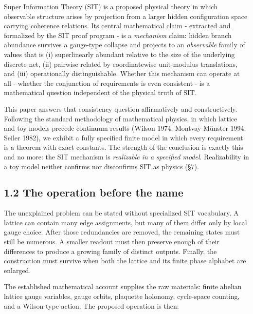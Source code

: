 \documentclass[
  american,
  11pt,
  letterpaper,
]{article}
\begin{document}
Super Information Theory (SIT) is a proposed physical theory in which observable structure arises by projection from a larger hidden configuration space carrying coherence relations. Its central mathematical claim - extracted and formalized by the SIT proof program - is a \emph{mechanism} claim: hidden branch abundance survives a gauge-type collapse and projects to an \emph{observable} family of values that is (i) superlinearly abundant relative to the size of the underlying discrete net, (ii) pairwise related by coordinatewise unit-modulus translations, and (iii) operationally distinguishable. Whether this mechanism can operate at all - whether the conjunction of requirements is even consistent - is a mathematical question independent of the physical truth of SIT.

This paper answers that consistency question affirmatively and constructively. Following the standard methodology of mathematical physics, in which lattice and toy models precede continuum results (Wilson 1974; Montvay-Münster 1994; Seiler 1982), we exhibit a fully specified finite model in which every requirement is a theorem with exact constants. The strength of the conclusion is exactly this and no more: the SIT mechanism is \emph{realizable in a specified model}. Realizability in a toy model neither confirms nor disconfirms SIT as physics (§7).

\subsection{1.2 The operation before the name}\label{the-operation-before-the-name}

The unexplained problem can be stated without specialized SIT vocabulary. A lattice can contain many edge assignments, but many of them differ only by local gauge choice. After those redundancies are removed, the remaining states must still be numerous. A smaller readout must then preserve enough of their differences to produce a growing family of distinct outputs. Finally, the construction must survive when both the lattice and its finite phase alphabet are enlarged.

The established mathematical account supplies the raw materials: finite abelian lattice gauge variables, gauge orbits, plaquette holonomy, cycle-space counting, and a Wilson-type action. The proposed operation is then:
\end{document}
